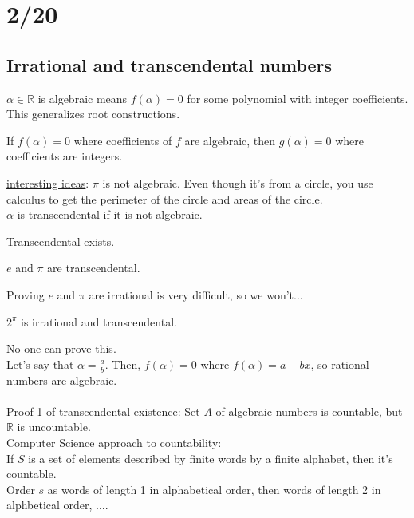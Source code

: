 \section*{2/20}
  \subsection*{Irrational and transcendental numbers}
    $\alpha \in \mathbb{R}$ is algebraic means $f(\alpha)= 0$ for some 
    polynomial with integer coefficients.\\
    This generalizes root constructions.\\
    \begin{theorem}
      If $f(\alpha) = 0$ where coefficients of $f$ are algebraic, then
      $g(\alpha) = 0$ where coefficients are integers.
    \end{theorem}
    \underline{interesting ideas}: $\pi$ is not algebraic. Even though it's
    from a circle, you use calculus to get the perimeter of the circle and
    areas of the circle.\\
    $\alpha$ is transcendental if it is not algebraic.\\
    \begin{theorem}
      Transcendental exists.
    \end{theorem}
    \begin{theorem}
      $e$ and $\pi$ are transcendental.
    \end{theorem}
    Proving $e$ and $\pi$ are irrational is very difficult, so we won't...\\
    \begin{theorem}
      $2^{\pi}$ is irrational and transcendental.
    \end{theorem}
    No one can prove this.\\
    Let's say that $\alpha = \frac{a}{b}$. Then, $f(\alpha) = 0$ where
    $f(\alpha) = a - bx$, so rational numbers are algebraic.\\\\
      Proof 1 of transcendental existence: Set $A$ of algebraic numbers is 
      countable, but $\mathbb{R}$ is uncountable.\\
    Computer Science approach to countability:\\
      If $S$ is a set of elements described by finite words by a finite 
      alphabet, then it's countable.\\
      Order $s$ as words of length 1 in alphabetical order, then words of 
      length 2 in alphbetical order, $\ldots$.\\
